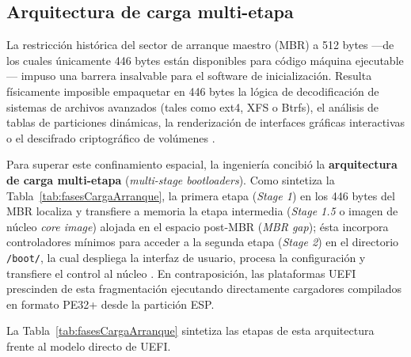 \documentclass[12pt]{article}
\begin{document}
\subsection{Arquitectura de carga multi-etapa}
\label{subsec:arquitecturaCargaMultiEtapa}

La restricción histórica del sector de arranque maestro (MBR) a 512 bytes —de los cuales únicamente 446 bytes están disponibles para código máquina ejecutable— impuso una barrera insalvable para el software de inicialización. Resulta físicamente imposible empaquetar en 446 bytes la lógica de decodificación de sistemas de archivos avanzados (tales como ext4, XFS o Btrfs), el análisis de tablas de particiones dinámicas, la renderización de interfaces gráficas interactivas o el descifrado criptográfico de volúmenes \parencite[\S 12.5.2, p.\ 419]{silberschatz2006fundamentos}.

Para superar este confinamiento espacial, la ingeniería concibió la \textbf{arquitectura de carga multi-etapa} (\textit{multi-stage bootloaders}). Como sintetiza la Tabla~\ref{tab:fasesCargaArranque}, la primera etapa (\textit{Stage 1}) en los 446 bytes del MBR localiza y transfiere a memoria la etapa intermedia (\textit{Stage 1.5} o imagen de núcleo \textit{core image}) alojada en el espacio post-MBR (\textit{MBR gap}); ésta incorpora controladores mínimos para acceder a la segunda etapa (\textit{Stage 2}) en el directorio \texttt{/boot/}, la cual despliega la interfaz de usuario, procesa la configuración y transfiere el control al núcleo \parencite{gnugrub2024manual}. En contraposición, las plataformas UEFI prescinden de esta fragmentación ejecutando directamente cargadores compilados en formato PE32+ desde la partición ESP.

La Tabla~\ref{tab:fasesCargaArranque} sintetiza las etapas de esta arquitectura frente al modelo directo de UEFI.
\end{document}
